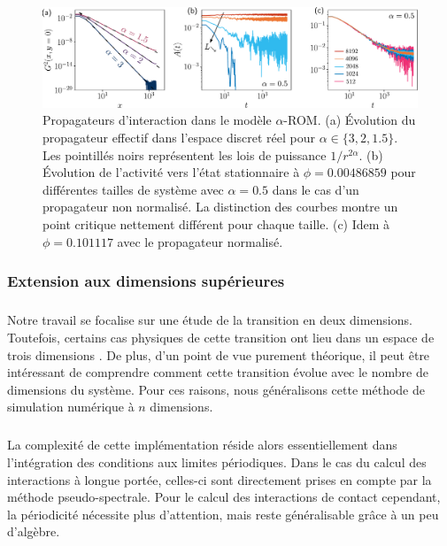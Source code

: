 \begin{figure}[h]
	\centering
	\includegraphics[width=\textwidth]{Chapitre3/Figures/Method/PropagTBLRR2D.pdf}
	\caption{Propagateurs d'interaction dans le modèle $\alpha$-ROM. (a) Évolution du propagateur effectif dans l'espace discret réel pour $\alpha \in \{ 3, 2, 1.5 \}$. Les pointillés noirs représentent les lois de puissance $1/r^{2\alpha}$. (b) Évolution de l'activité vers l'état stationnaire à $\phi = 0.00486859$ pour différentes tailles de système avec $\alpha = 0.5$ dans le cas d'un propagateur non normalisé. La distinction des courbes montre un point critique nettement différent pour chaque taille. (c) Idem à $\phi=0.101117$ avec le propagateur normalisé.}
	\label{fig:PropagTBLRR}
\end{figure}

\subsubsection{Extension aux dimensions supérieures}

\subparagraph{}Notre travail se focalise sur une étude de la transition en deux dimensions. Toutefois, certains cas physiques de cette transition ont lieu dans un espace de trois dimensions \cite{pine_chaos_2005}. De plus, d'un point de vue purement théorique, il peut être intéressant de comprendre comment cette transition évolue avec le nombre de dimensions du système. Pour ces raisons, nous généralisons cette méthode de simulation numérique à $n$ dimensions.

\subparagraph{}La complexité de cette implémentation réside alors essentiellement dans l'intégration des conditions aux limites périodiques. Dans le cas du calcul des interactions à longue portée, celles-ci sont directement prises en compte par la méthode pseudo-spectrale. Pour le calcul des interactions de contact cependant, la périodicité nécessite plus d'attention, mais reste généralisable grâce à un peu d'algèbre. 


